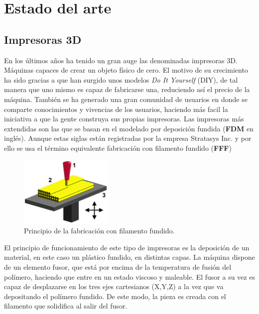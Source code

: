 \chapter{Estado del arte}
\label{estado.arte}

\section{Impresoras 3D}
\label{arte_immpresoras}
En los últimos años ha tenido un gran auge las denominadas impresoras 3D. Máquinas capaces de crear un objeto físico de cero. El motivo de su crecimiento ha sido gracias a que han surgido unos modelos \textit{Do It Yourself} (DIY), de tal manera que uno mismo es capaz de fabricarse una, reduciendo así el precio de la máquina. También se ha generado una gran comunidad de usuarios en donde se comparte conocimientos y vivencias de los usuarios, haciendo más facil la iniciativa a que la gente construya sus propias impresoras. Las impresoras más extendidas son las que se basan en el modelado por deposición fundida (\textbf{FDM\textregistered} en inglés). Aunque estas siglas están registradas por la empresa Stratasys Inc. y por ello se usa el término equivalente fabricación con filamento fundido (\textbf{FFF})          

    \begin{figure}[H]
            \centering
            \includegraphics[width=0.4\textwidth]{images/FDM_by_Zureks.png}
            \caption{Principio de la fabricación con filamento fundido.}
            \label{fig:impr_fdm}
    \end{figure}

El principio de funcionamiento de este tipo de impresoras es la deposición de un material, en este caso un plástico fundido, en distintas capas. La máquina dispone de un elemento fusor, que está por encima de la temperatura de fusión del polímero, haciendo que entre en un estado viscoso y maleable. El fusor a su vez es capaz de desplazarse en los tres ejes cartesianos (X,Y,Z) a la vez que va depositando el polímero fundido. De este modo, la pieza es creada con el filamento que solidifica al salir del fusor.

